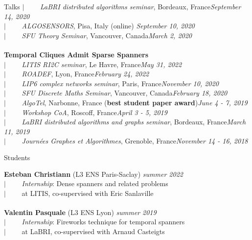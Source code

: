 \documentclass[french]{resume} %
\begin{document}
\begin{rSection}{Talks}
		$| \qquad$ \textit{LaBRI distributed algorithms seminar}, Bordeaux, France\hfill {\em September 14, 2020}\\
		$| \qquad$ \textit{ALGOSENSORS}, Pisa, Italy (online) \hfill {\em September 10, 2020} \\
		$| \qquad$ \textit{SFU Theory Seminar}, Vancouver, Canada\hfill {\em March 2, 2020}
		\\ \\
		{\bf Temporal Cliques Admit Sparse Spanners} \\
		$| \qquad$ \textit{LITIS RI2C seminar}, Le Havre, France\hfill {\em May 31, 2022} \\
		$| \qquad$ \textit{ROADEF}, Lyon, France\hfill {\em February 24, 2022} \\
		$| \qquad$ \textit{LIP6 complex networks seminar}, Paris, France\hfill {\em November 10, 2020} \\
		$| \qquad$ \textit{SFU Discrete Maths Seminar}, Vancouver, Canada\hfill {\em February 18, 2020} \\
		$| \qquad$ \textit{AlgoTel}, Narbonne, France (\textbf{best student paper award})\hfill {\em June 4 - 7, 2019} \\
		$| \qquad$ \textit{Workshop CoA}, Roscoff, France\hfill {\em April 3 - 5, 2019} \\
		$| \qquad$ \textit{LaBRI distributed algorithms and graphs seminar}, Bordeaux, France\hfill {\em March 11, 2019} \\
		$| \qquad$ \textit{Journées Graphes et Algorithmes}, Grenoble, France\hfill {\em November 14 - 16, 2018}
	\end{rSection}
	
	
	
	\begin{rSection}{Students}
		
		{\bf Esteban Christiann} (L3 ENS Paris-Saclay) \hfill {\em summer 2022}
		\\
		$| \qquad$ \textit{Internship}: Dense spanners and related problems\\
		$| \qquad$ at LITIS, co-supervised with Eric Sanlaville
		\\ \\	
		{\bf Valentin Pasquale} (L3 ENS Lyon) \hfill {\em summer 2019} 
		\\
		$| \qquad$ \textit{Internship}: Fireworks technique for temporal spanners\\
		$| \qquad$ at LaBRI, co-supervised with Arnaud Casteigts
	\end{rSection}
	
\end{document}
